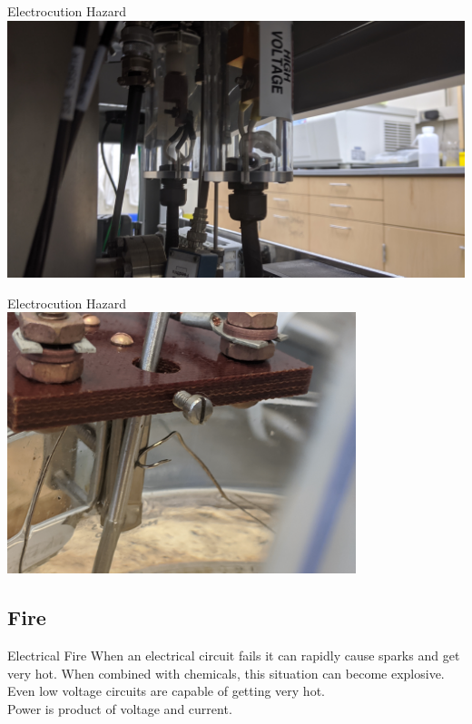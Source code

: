 \documentclass{presentation}
\begin{document}
\begin{frame}{Electrocution Hazard}
  \centering
  \includegraphics[width=\textwidth]{"./IMG_20191001_140050.jpg"}
\end{frame}

\begin{frame}{Electrocution Hazard}
  \centering
  \includegraphics[height=3in]{"./IMG_20200904_131436.jpg"}
\end{frame}

\subsection{Fire}

\begin{frame}{Electrical Fire}
  When an electrical circuit fails it can rapidly cause sparks and get very hot.
  \vfill
  When combined with chemicals, this situation can become explosive.
  \vfill
  Even low voltage circuits are capable of getting very hot. \\
  Power is product of voltage and current.
\end{frame}
\end{document}
